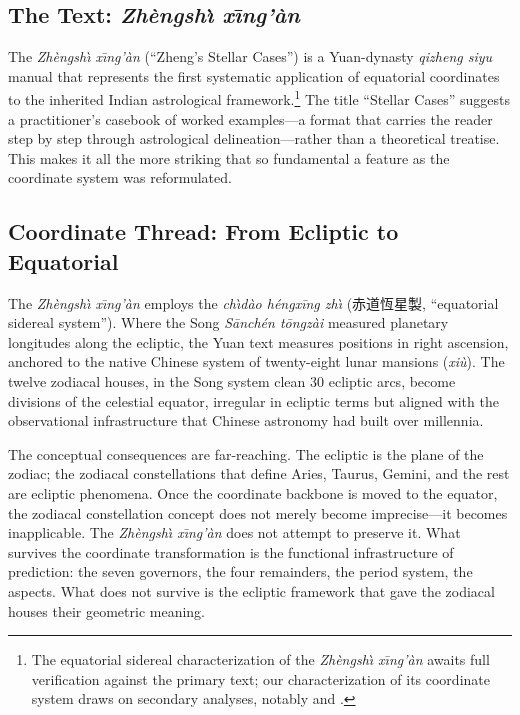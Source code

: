 \documentclass[10pt,a4paper]{article}
\newcommand{\zh}[1]{#1}
\begin{document}
\subsection*{The Text: \textit{Zh\`{e}ngsh\`{\i} x\={\i}ng'\`{a}n}}

The \textit{Zh\`{e}ngsh\`{\i} x\={\i}ng'\`{a}n}
(``Zheng's Stellar Cases'') is a Yuan-dynasty \textit{qizheng siyu} manual
that represents the first systematic application of equatorial
coordinates to the inherited Indian astrological framework.\footnote{The
equatorial sidereal characterization of the \textit{Zh\`{e}ngsh\`{\i} x\={\i}ng'\`{a}n} awaits full
verification against the primary text; our characterization of its
coordinate system draws on secondary analyses, notably
\citealt{ho2003astrology} and \citealt{niu2010fourremains}.}
The title ``Stellar Cases'' suggests a practitioner's casebook of
worked examples---a format that carries the reader step by step through
astrological delineation---rather than a theoretical treatise.  This
makes it all the more striking that so fundamental a feature as the
coordinate system was reformulated.

\subsection*{Coordinate Thread: From Ecliptic to Equatorial}

The \textit{Zh\`{e}ngsh\`{\i} x\={\i}ng'\`{a}n} employs the \textit{ch\`{\i}d\`ao h\'{e}ngx\=ing zh\`{\i}} (\zh{赤道恆星製},
``equatorial sidereal system'').  Where the Song \textit{S\={a}nch\'{e}n t\={o}ngz\`{a}i}
measured planetary longitudes along the ecliptic, the Yuan text
measures positions in right ascension, anchored to the native
Chinese system of twenty-eight lunar mansions (\textit{xi\`u}).  The twelve zodiacal houses,
in the Song system clean 30\textdegree{} ecliptic arcs,
become divisions of the celestial equator, irregular in ecliptic
terms but aligned with the observational infrastructure that Chinese
astronomy had built over millennia.

The conceptual consequences are far-reaching.  The ecliptic is the
plane of the zodiac; the zodiacal constellations that define Aries,
Taurus, Gemini, and the rest are ecliptic phenomena.  Once the
coordinate backbone is moved to the equator, the zodiacal constellation
concept does not merely become imprecise---it becomes inapplicable.
The \textit{Zh\`{e}ngsh\`{\i} x\={\i}ng'\`{a}n} does not attempt to preserve it.  What survives the
coordinate transformation is the functional infrastructure of
prediction: the seven governors, the four remainders, the period
system, the aspects.  What does not survive is the ecliptic framework
that gave the zodiacal houses their geometric meaning.
\end{document}
